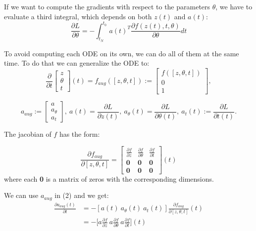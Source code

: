 \documentclass[10pt,a4paper]{article}
\theoremstyle{definition}
\theoremstyle{definition}
\begin{document}
If we want to compute the gradients with respect to the parameters $\theta$, we have to evaluate a third integral, which depends on both $z(t)$ and $a(t)$:
$$
\frac{\partial L}{\partial \theta} = - \int^{t_0}_{t_N} a(t)^T \frac{\partial f(z(t),t,\theta)} {\partial \theta} dt
$$


To avoid computing each ODE on its own, we can do all of them at the same time. To do that we can generalize the ODE to:
$$
\frac{\partial}{\partial t} \begin{bmatrix}
							z \\ \theta \\ t
							\end{bmatrix} (t) 
= f_{aug}([z,\theta ,t]) := \begin{bmatrix}
							f([z,\theta ,t]) \\ 0 \\ 1
							\end{bmatrix},
$$

$$
a_{aug} := \begin{bmatrix}
			a \\ a_{\theta} \\ a_t
			\end{bmatrix}, \ 
a(t) = \frac{\partial L}{\partial z(t)}, \ 
a_\theta (t) = \frac{\partial L}{\partial \theta (t)}, \ 
a_t(t) := \frac{\partial L}{\partial t(t)}.
$$

The jacobian of $f$ has the form:

$$
\frac{\partial f_{aug}}{\partial [z,\theta,t]} = \begin{bmatrix}
\frac{\partial f}{\partial z} & \frac{\partial f}{\partial \theta} & \frac{\partial f}{\partial t} \\
\textbf{0} & \textbf{0} & \textbf{0} \\
\textbf{0} & \textbf{0} & \textbf{0}
\end{bmatrix}(t)
$$
where each \textbf{0} is a matrix of zeros with the corresponding dimensions.

We can use $a_{aug}$ in (2) and we get:
\begin{align*}
\frac{\partial a_{aug}(t)}{\partial t} 
&= - [a(t) \ a_\theta (t) \ a_t (t)]\frac{\partial f_{aug}}{\partial [ z,\theta , t]}(t) \\
&= -\Big[a\frac{\partial f}{\partial z} \ a\frac{\partial f}{\partial \theta} \ a\frac{\partial  f}{\partial t}\Big] (t)
\end{align*}
\end{document}
